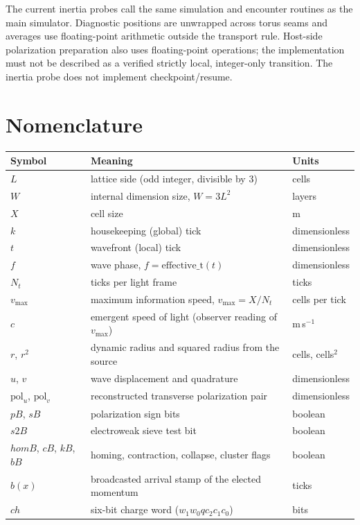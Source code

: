 \documentclass{ijuc}
\renewcommand{\arraystretch}{1.5}
\begin{document}
The current inertia probes call the same simulation and encounter routines as the main simulator. Diagnostic positions are unwrapped across torus seams and averages use floating-point arithmetic outside the transport rule. Host-side polarization preparation also uses floating-point operations; the implementation must not be described as a verified strictly local, integer-only transition. The inertia probe does not implement checkpoint/resume.

\section*{Nomenclature}
\begin{center}
\renewcommand{\arraystretch}{1.25}
\begin{tabular}{@{}p{2.8cm}p{9.2cm}p{2.8cm}@{}}
\hline
\textbf{Symbol} & \textbf{Meaning} & \textbf{Units}\\
\hline
$L$ & lattice side (odd integer, divisible by 3) & cells\\
$W$ & internal dimension size, $W=3L^{2}$ & layers\\
$X$ & cell size & m\\
$k$ & housekeeping (global) tick & dimensionless\\
$t$ & wavefront (local) tick & dimensionless\\
$f$ & wave phase, $f=\mathrm{effective\_t}(t)$ & dimensionless\\
$N_t$ & ticks per light frame & ticks\\
$v_{\max}$ & maximum information speed, $v_{\max}=X/N_t$ & cells per tick\\
$c$ & emergent speed of light (observer reading of $v_{\max}$) & m\,s$^{-1}$\\
$r$, $r^{2}$ & dynamic radius and squared radius from the source & cells, cells$^{2}$\\
$u$, $v$ & wave displacement and quadrature & dimensionless\\
$\mathrm{pol}_u$, $\mathrm{pol}_v$ & reconstructed transverse polarization pair & dimensionless\\
$pB$, $sB$ & polarization sign bits & boolean\\
$s2B$ & electroweak sieve test bit & boolean\\
$homB$, $cB$, $kB$, $bB$ & homing, contraction, collapse, cluster flags & boolean\\
$b(x)$ & broadcasted arrival stamp of the elected momentum & ticks\\
$ch$ & six-bit charge word ($w_1 w_0 q c_2 c_1 c_0$) & bits\\

\end{tabular}
\end{center}
\end{document}

